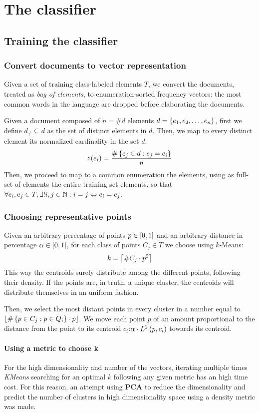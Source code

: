 \documentclass[\main/main.tex]{subfiles}
\begin{document}
\chapter{The classifier}

\section{Training the classifier}

\subsection{Convert documents to vector representation}
Given a set of training class-labeled elements \(T\), we convert the documents, treated as \textit{bag of elements}, to enumeration-sorted frequency vectors: the most common words in the language are dropped before elaborating the documents.

Given a document composed of \(n=\#d\) elements \(d = \left\{e_1, e_2, \ldots, e_n\right\}\), first we define \(d_\neq \subseteq d\) as the set of distinct elements in \(d\). Then, we map to every distinct element its normalized cardinality in the set \(d\):
\[
	z(e_i) = \frac{\#\left\{e_j \in d: e_j=e_i\right\}}{n}
\]
Then, we proceed to map to a common enumeration the elements, using as full-set of elements the entire training set elements, so that \(\forall e_i, e_j \in T, \exists! i, j \in \mathbb{N}: i=j \Leftrightarrow e_i=e_j \).

\subsection{Choosing representative points}
Given an arbitrary percentage of points \(p \in \left[0,1\right]\) and an arbitrary distance in percentage \(\alpha \in \left[0,1\right]\), for each class of points \(C_j \in T\) we choose using \(k\)-Means:
\[
	k=\left\lceil\#C_j\cdot p^2\right\rceil
\]
This way the centroids surely distribute among the different points, following their density. If the points are, in truth, a unique cluster, the centroids will distribute themselves in an uniform fashion.

Then, we select the most distant points in every cluster in a number equal to \(\left\lfloor\#\left\{p \in C_j: p \in Q_i\right\}\cdot p\right\rfloor\). We move each point \(p\) of an amount proportional to the distance from the point to its centroid \(c_i\):\(\alpha \cdot L^2\left(p, c_i\right)\) towards its centroid.

\subsubsection{Using a metric to choose k}
For the high dimensionality and number of the vectors, iterating multiple times \textit{KMeans} searching for an optimal \(k\) following any given metric has an high time cost. For this reason, an attempt using \textbf{PCA} to reduce the dimensionality and predict the number of clusters in high dimensionality space using a density metric was made.
\end{document}
